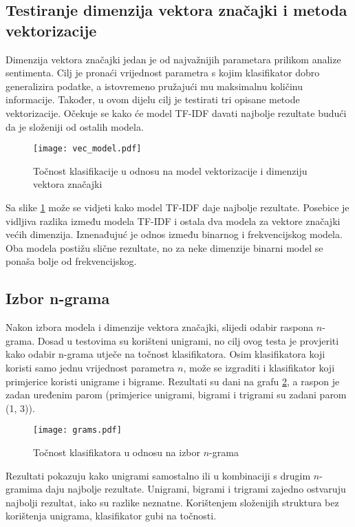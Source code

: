 \documentclass[times, utf8, zavrsni, numeric]{fer}
\begin{document}
\subsection{Testiranje dimenzija vektora značajki i metoda vektorizacije}
Dimenzija vektora značajki jedan je od najvažnijih parametara prilikom analize sentimenta.
Cilj je pronaći vrijednost parametra s kojim klasifikator dobro generalizira podatke, a istovremeno
pružajući mu maksimalnu količinu informacije.
Također, u ovom dijelu cilj je testirati tri opisane metode vektorizacije.
Očekuje se kako će model TF-IDF davati najbolje rezultate budući da je složeniji od ostalih modela.

\begin{figure}
\centering
\texttt{[image: vec\_model.pdf]}
\caption{Točnost klasifikacije u odnosu na model vektorizacije i dimenziju vektora značajki}
\label{fig:vecmodel}
\end{figure}

Sa slike \ref{fig:vecmodel} može se vidjeti kako model TF-IDF daje najbolje rezultate.
Posebice je vidljiva razlika između modela TF-IDF i ostala dva modela za vektore značajki većih
dimenzija.
Iznenađujuć je odnos između binarnog i frekvencijskog modela. 
Oba modela postižu slične rezultate, no za neke dimenzije binarni model se ponaša bolje od frekvencijskog.

\subsection{Izbor n-grama}
Nakon izbora modela i dimenzije vektora značajki, slijedi odabir raspona $n$-grama.
Dosad u testovima su korišteni unigrami, no cilj ovog testa je provjeriti kako odabir
n-grama utječe na točnost klasifikatora.
Osim klasifikatora koji koristi samo jednu vrijednost parametra $n$, može se izgraditi i klasifikator
koji primjerice koristi unigrame i bigrame. Rezultati su dani na grafu \ref{fig:grams.pdf}, 
a raspon je zadan uređenim parom (primjerice unigrami, bigrami i trigrami su zadani parom (1, 3)).

\begin{figure}
\centering
\texttt{[image: grams.pdf]}
\caption{Točnost klasifikatora u odnosu na izbor $n$-grama}
\label{fig:grams.pdf}
\end{figure}

Rezultati pokazuju kako unigrami samostalno ili u kombinaciji s drugim $n$-gramima daju najbolje rezultate.
Unigrami, bigrami i trigrami zajedno ostvaruju najbolji rezultat, iako su razlike neznatne.
Korištenjem složenijih struktura bez korištenja unigrama, klasifikator gubi na točnosti. 
\end{document}
